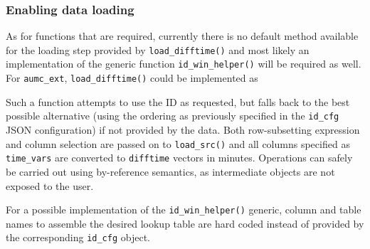 \documentclass[
  notitle]{jss}
\begin{document}
\hypertarget{enabling-data-loading}{%
\subsubsection{Enabling data loading}\label{enabling-data-loading}}

As for functions that are required, currently there is no default method
available for the loading step provided by \texttt{load\_difftime()} and
most likely an implementation of the generic function
\texttt{id\_win\_helper()} will be required as well. For
\texttt{aumc\_ext}, \texttt{load\_difftime()} could be implemented as

\begin{CodeChunk}
\end{CodeChunk}

Such a function attempts to use the ID as requested, but falls back to
the best possible alternative (using the ordering as previously
specified in the \texttt{id\_cfg} JSON configuration) if not provided by
the data. Both row-subsetting expression and column selection are passed
on to \texttt{load\_src()} and all columns specified as
\texttt{time\_vars} are converted to \texttt{difftime} vectors in
minutes. Operations can safely be carried out using by-reference
semantics, as intermediate objects are not exposed to the user.

For a possible implementation of the \texttt{id\_win\_helper()} generic,
column and table names to assemble the desired lookup table are hard
coded instead of provided by the corresponding \texttt{id\_cfg} object.
\end{document}

